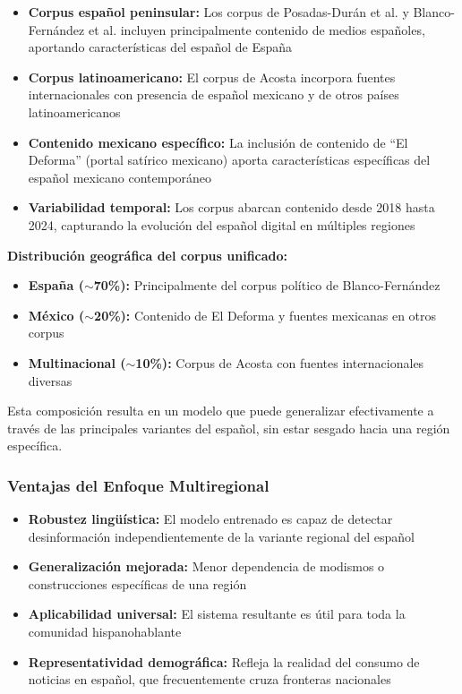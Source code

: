 \begin{itemize}
    \item \textbf{Corpus español peninsular:} Los corpus de Posadas-Durán et al. \cite{posadas2019detection} y Blanco-Fernández et al. \cite{blanco2024enhancing} incluyen principalmente contenido de medios españoles, aportando características del español de España
    
    \item \textbf{Corpus latinoamericano:} El corpus de Acosta \cite{acosta2019construccion} incorpora fuentes internacionales con presencia de español mexicano y de otros países latinoamericanos
    
    \item \textbf{Contenido mexicano específico:} La inclusión de contenido de ``El Deforma'' (portal satírico mexicano) aporta características específicas del español mexicano contemporáneo
    
    \item \textbf{Variabilidad temporal:} Los corpus abarcan contenido desde 2018 hasta 2024, capturando la evolución del español digital en múltiples regiones
\end{itemize}

\textbf{Distribución geográfica del corpus unificado:}
\begin{itemize}
    \item \textbf{España ($\sim$70\%):} Principalmente del corpus político de Blanco-Fernández
    \item \textbf{México ($\sim$20\%):} Contenido de El Deforma y fuentes mexicanas en otros corpus
    \item \textbf{Multinacional ($\sim$10\%):} Corpus de Acosta con fuentes internacionales diversas
\end{itemize}

Esta composición resulta en un modelo que puede generalizar efectivamente a través de las principales variantes del español, sin estar sesgado hacia una región específica.

\subsubsection{Ventajas del Enfoque Multiregional}

\begin{itemize}
    \item \textbf{Robustez lingüística:} El modelo entrenado es capaz de detectar desinformación independientemente de la variante regional del español
    \item \textbf{Generalización mejorada:} Menor dependencia de modismos o construcciones específicas de una región
    \item \textbf{Aplicabilidad universal:} El sistema resultante es útil para toda la comunidad hispanohablante
    \item \textbf{Representatividad demográfica:} Refleja la realidad del consumo de noticias en español, que frecuentemente cruza fronteras nacionales
\end{itemize}

